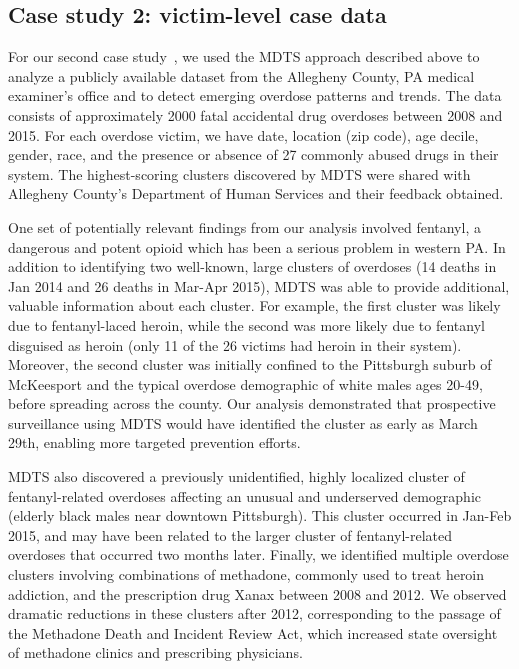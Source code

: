 \documentclass{acm_proc_article-sp}
\begin{document}
\subsection{Case study 2: victim-level case data}

For our second case study~\cite{neill2017overdose}, we used the MDTS approach described above to analyze a publicly available dataset from the Allegheny County, PA 
medical examiner's office and to detect emerging overdose patterns and trends.  The data consists of approximately 2000 fatal accidental drug overdoses between 2008 
and 2015.  For each overdose victim, we have date, location (zip code), age decile, gender, race, and the presence or absence of 27 commonly abused drugs in their 
system.  The highest-scoring clusters discovered by MDTS were shared with Allegheny County's Department of Human Services and their feedback obtained.

One set of potentially relevant findings from our analysis involved fentanyl, a dangerous and potent opioid which has been a serious problem in western PA.  In 
addition to identifying two well-known, large clusters of overdoses (14 deaths in Jan 2014 and 26 deaths in Mar-Apr 2015), MDTS was able to provide additional, 
valuable information about each cluster.  For example, the first cluster was likely due to fentanyl-laced heroin, while the second was more likely due to fentanyl 
disguised as heroin (only 11 of the 26 victims had heroin in their system).  Moreover, the second cluster was initially confined to the Pittsburgh suburb of McKeesport 
and the typical overdose demographic of white males ages 20-49, before spreading across the county.  Our analysis demonstrated that prospective surveillance using MDTS
would have identified the cluster as early as March 29th, enabling more targeted prevention efforts.  

MDTS also discovered a previously unidentified, highly localized 
cluster of fentanyl-related overdoses affecting an unusual and underserved demographic (elderly black males near downtown Pittsburgh).  This cluster occurred in 
Jan-Feb 2015, and may have been related to the larger cluster of fentanyl-related overdoses that occurred two months later.  Finally, we identified multiple overdose 
clusters involving combinations of methadone, commonly used to treat heroin addiction, and the prescription drug Xanax between 2008 and 2012.  We observed dramatic reductions in these clusters after 2012, corresponding to the passage of the 
Methadone Death and Incident Review Act, which increased state oversight of methadone clinics and prescribing physicians.
\end{document}
